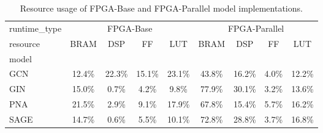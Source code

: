 \begin{table}
\centering
\caption{Resource usage of FPGA-Base and FPGA-Parallel model implementations.}
\label{tab:resources}
\begin{tabular}{l|cccc|cccc|}
\toprule
runtime\_type & \multicolumn{4}{c|}{FPGA-Base} & \multicolumn{4}{c|}{FPGA-Parallel} \\
resource &      BRAM &   DSP &    FF &   LUT &          BRAM &   DSP &   FF &   LUT \\
model &           &       &       &       &               &       &      &       \\
\midrule
GCN   &     12.4\% & 22.3\% & 15.1\% & 23.1\% &         43.8\% & 16.2\% & 4.0\% & 12.2\% \\
GIN   &     15.0\% &  0.7\% &  4.2\% &  9.8\% &         77.9\% & 30.1\% & 3.2\% & 13.6\% \\
PNA   &     21.5\% &  2.9\% &  9.1\% & 17.9\% &         67.8\% & 15.4\% & 5.7\% & 16.2\% \\
SAGE  &     14.7\% &  0.6\% &  5.5\% & 10.1\% &         72.8\% & 28.8\% & 3.7\% & 16.8\% \\
\bottomrule
\end{tabular}
\end{table}
